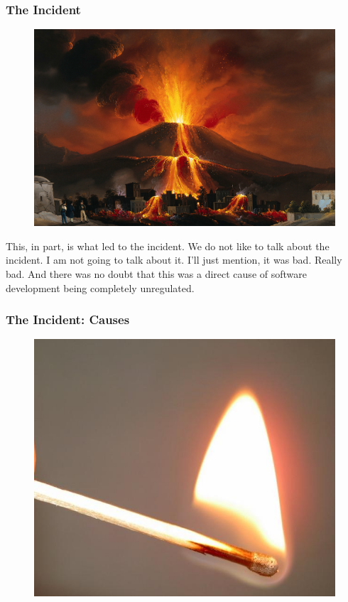 \begin{frame}[fragile]
\frametitle{The Incident}

\begin{figure}
\includegraphics[scale=0.1]{volcano}
\end{figure}

\end{frame}

This,
in part,
is what led to the incident.
We do not like to talk about the incident.
I am not going to talk about it.
I'll just mention,
it was bad.
Really bad.
And there was no doubt that this was a direct cause
of software development being completely unregulated.

\begin{frame}[fragile]
\frametitle{The Incident: Causes}

\begin{figure}
\includegraphics[scale=0.5]{match}
\end{figure}

\end{frame}

